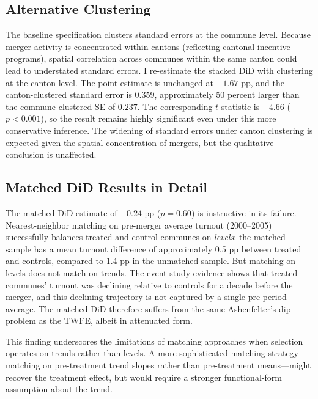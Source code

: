 \documentclass[12pt]{article}
\begin{document}
\subsection{Alternative Clustering}

The baseline specification clusters standard errors at the commune level. Because merger activity is concentrated within cantons (reflecting cantonal incentive programs), spatial correlation across communes within the same canton could lead to understated standard errors. I re-estimate the stacked DiD with clustering at the canton level. The point estimate is unchanged at $-1.67$ pp, and the canton-clustered standard error is $0.359$, approximately 50 percent larger than the commune-clustered SE of $0.237$. The corresponding $t$-statistic is $-4.66$ ($p < 0.001$), so the result remains highly significant even under this more conservative inference. The widening of standard errors under canton clustering is expected given the spatial concentration of mergers, but the qualitative conclusion is unaffected.

\subsection{Matched DiD Results in Detail}

The matched DiD estimate of $-0.24$ pp ($p = 0.60$) is instructive in its failure. Nearest-neighbor matching on pre-merger average turnout (2000--2005) successfully balances treated and control communes on \textit{levels}: the matched sample has a mean turnout difference of approximately 0.5 pp between treated and controls, compared to 1.4 pp in the unmatched sample. But matching on levels does not match on trends. The event-study evidence shows that treated communes' turnout was declining relative to controls for a decade before the merger, and this declining trajectory is not captured by a single pre-period average. The matched DiD therefore suffers from the same Ashenfelter's dip problem as the TWFE, albeit in attenuated form.

This finding underscores the limitations of matching approaches when selection operates on trends rather than levels. A more sophisticated matching strategy---matching on pre-treatment trend slopes rather than pre-treatment means---might recover the treatment effect, but would require a stronger functional-form assumption about the trend.


\end{document}
